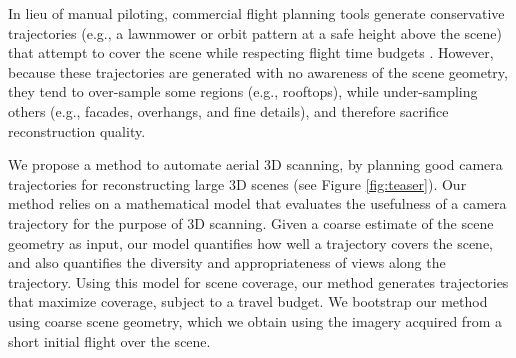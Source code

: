 
In lieu of manual piloting, commercial flight planning tools generate conservative trajectories (e.g., a lawnmower or orbit pattern at a safe height above the scene) that attempt to cover the scene while respecting flight time budgets \cite{3dr:2017a,pix4d:2017a}.
However, because these trajectories are generated with no awareness of the scene geometry, they tend to over-sample some regions (e.g., rooftops), while under-sampling others (e.g., facades, overhangs, and fine details), and therefore sacrifice reconstruction quality.

We propose a method to automate aerial 3D scanning, by planning good camera trajectories for reconstructing large 3D scenes (see Figure \ref{fig:teaser}).
Our method relies on a mathematical model that evaluates the usefulness of a camera trajectory for the purpose of 3D scanning.
Given a coarse estimate of the scene geometry as input, our model quantifies how well a trajectory covers the scene, and also quantifies the diversity and appropriateness of views along the trajectory.
Using this model for scene coverage, our method generates trajectories that maximize coverage, subject to a travel budget.
We bootstrap our method using coarse scene geometry, which we obtain using the imagery acquired from a short initial flight over the scene. 


